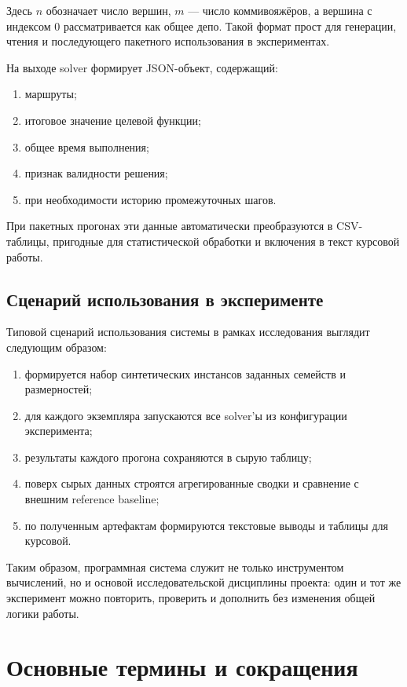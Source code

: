 \documentclass[a4paper,12pt]{article}
\begin{document}
Здесь \(n\) обозначает число вершин, \(m\) --- число коммивояжёров, а вершина с индексом \(0\) рассматривается как общее депо. Такой формат прост для генерации, чтения и последующего пакетного использования в экспериментах.

На выходе solver формирует JSON-объект, содержащий:
\begin{enumerate}[label=\arabic*.]
  \item маршруты;
  \item итоговое значение целевой функции;
  \item общее время выполнения;
  \item признак валидности решения;
  \item при необходимости историю промежуточных шагов.
\end{enumerate}

При пакетных прогонах эти данные автоматически преобразуются в CSV-таблицы, пригодные для статистической обработки и включения в текст курсовой работы.

\subsection{Сценарий использования в эксперименте}

Типовой сценарий использования системы в рамках исследования выглядит следующим образом:
\begin{enumerate}[label=\arabic*.]
  \item формируется набор синтетических инстансов заданных семейств и размерностей;
  \item для каждого экземпляра запускаются все solver'ы из конфигурации эксперимента;
  \item результаты каждого прогона сохраняются в сырую таблицу;
  \item поверх сырых данных строятся агрегированные сводки и сравнение с внешним reference baseline;
  \item по полученным артефактам формируются текстовые выводы и таблицы для курсовой.
\end{enumerate}

Таким образом, программная система служит не только инструментом вычислений, но и основой исследовательской дисциплины проекта: один и тот же эксперимент можно повторить, проверить и дополнить без изменения общей логики работы.

\section{Основные термины и сокращения}
\end{document}
